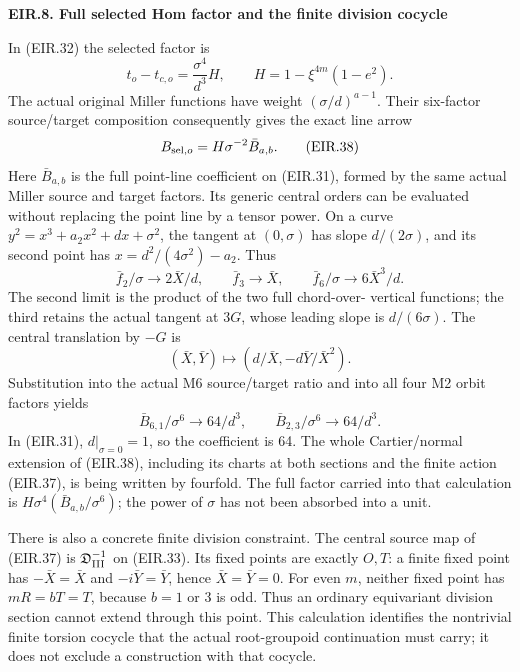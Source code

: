 \par

\medskip\noindent\textbf{EIR.8. Full selected Hom factor and the finite division cocycle}

\par\nobreak

In (EIR.32) the selected factor is
\[
 t_o-t_{c,o}=\frac{\sigma^4}{d^3}H,\qquad
 H=1-\xi^{4m}(1-e^2).
\]
The actual original Miller functions have weight
\((\sigma/d)^{a-1}\). Their six-factor source/target
composition consequently gives the exact line arrow
\[
 B_{{\rm sel},o}=H\sigma^{-2}\bar B_{a,b}.
 \tag{EIR.38}
\]
Here \(\bar B_{a,b}\) is the full point-line coefficient
on (EIR.31), formed by the same actual Miller source and
target factors. Its generic central orders can be evaluated
without replacing the point line by a tensor power. On a
curve \(y^2=x^3+a_2x^2+d x+\sigma^2\), the tangent at
\((0,\sigma)\) has slope \(d/(2\sigma)\), and its
second point has \(x=d^2/(4\sigma^2)-a_2\). Thus
\[
 \bar f_2/\sigma\longrightarrow 2\bar X/d,
 \qquad \bar f_3\longrightarrow\bar X,
 \qquad \bar f_6/\sigma\longrightarrow6\bar X^3/d.
 \tag{EIR.39}
\]
The second limit is the product of the two full chord-over-
vertical functions; the third retains the actual tangent
at \(3G\), whose leading slope is \(d/(6\sigma)\).
The central translation by \(-G\) is
\[
 (\bar X,\bar Y)\longmapsto
 (d/\bar X,-d\bar Y/\bar X^2).
\]
Substitution into the actual M6 source/target ratio and
into all four M2 orbit factors yields
\[
 \bar B_{6,1}/\sigma^6\longrightarrow64/d^3,
 \qquad \bar B_{2,3}/\sigma^6\longrightarrow64/d^3.
 \tag{EIR.40}
\]
In (EIR.31), \(d|_{\sigma=0}=1\), so the coefficient is
64. The whole Cartier/normal extension of (EIR.38),
including its charts at both sections and the finite
action (EIR.37), is being written by fourfold. The full
factor carried into that calculation is
\(H\sigma^4(\bar B_{a,b}/\sigma^6)\); the power of
\(\sigma\) has not been absorbed into a unit.

There is also a concrete finite division constraint.
The central source map of (EIR.37) is
\(\mathfrak D_{\rm III}^{-1}\) on (EIR.33).
Its fixed points are exactly \(O,T\): a finite fixed
point has \(-\bar X=\bar X\) and \(-i\bar Y=\bar Y\),
hence \(\bar X=\bar Y=0\). For even \(m\), neither fixed
point has \(mR=bT=T\), because \(b=1\) or 3 is odd.
Thus an ordinary equivariant division section cannot
extend through this point. This calculation identifies
the nontrivial finite torsion cocycle that the actual
root-groupoid continuation must carry; it does not
exclude a construction with that cocycle.

